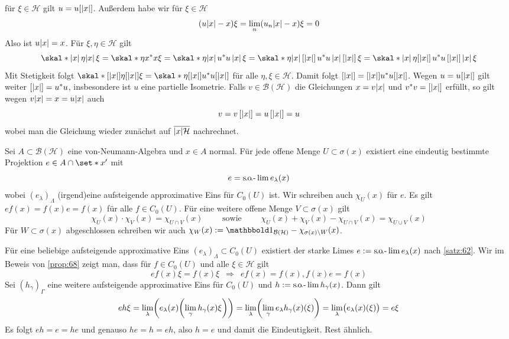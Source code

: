 \begin{beweis}
\[	\]
	für $\xi \in \mathcal{H}$ gilt $u= u [\abs*{x}]$.
	Außerdem habe wir für $\xi \in \mathcal{H}$
	\begin{align}
		\enbrace*{u \abs*{x}- x} \xi = \lim_n (u_n \abs*{x} - x) \xi = 0 
	\end{align}
	Also ist $u \abs*{x}=x$.
	Für $\xi,\eta \in \mathcal{H}$ gilt 
	\[
		\skal*{\abs*{x}\, \eta}{\abs*{x}\, \xi} = \skal*{\eta}{x^*x \xi} = \skal*{\eta}{\abs*{x}\, u^*u \,\abs*{x}\, \xi} = \skal*{\eta}{ \abs*{x}\, [\abs*{x}]\, u^*u \,\abs*{x}\, [\abs*{x}]\, \xi} 
		= \skal*{\abs*{x}\,\eta}{[\abs*{x}]\, u^*u \,[\abs*{x}]\, \abs*{x}\, \xi}
	\]
	Mit Stetigkeit folgt $\skal*{[\abs*{x}] \eta}{[\abs*{x}] \xi} = \skal*{\eta}{[\abs*{x}] u^*u [\abs*{x}]}$ für alle $\eta,\xi \in \mathcal{H}$.
	Damit folgt $[\abs*{x}] = [\abs*{x}] u^*u [\abs*{x}]$.
	Wegen $u=u[\abs*{x}]$ gilt weiter $[\abs*{x}]=u^*u$, insbesondere ist $u$ eine partielle Isometrie.
	Falls $v \in \mathcal{B}(\mathcal{H})$ die Gleichungen $x=v \abs*{x}$ und $v^*v= [\abs*{x}]$ erfüllt, so gilt wegen $v \abs*{x}=x=u \abs*{x}$ auch 
	\[
		v= v\, [\abs*{x}] = u \,[\abs*{x}] = u 
	\]
	wobei man die Gleichung wieder zunächst auf $\overline{\abs*{x} \mathcal{H}}$ nachrechnet.
\end{beweis}

\begin{proposition}[label=prop:612]
	Sei $A \subset \mathcal{B}(\mathcal{H})$ eine von-Neumann-Algebra und $x \in A$ normal.
	Für jede offene Menge $U \subset \sigma(x)$ existiert eine eindeutig bestimmte Projektion $e \in A \cap \set*{x}'$ mit 
	\[
		e=\solim e_\lambda(x)
	\]
	wobei $(e_\lambda)_\Lambda$ (irgend)eine aufsteigende approximative Eins für $C_0(U)$ ist.
	Wir schreiben auch $\chi_U(x)$ für $e$.
	Es gilt $e f(x) = f(x) e = f(x)$ für alle $f \in C_0(U)$.
	Für eine weitere offene Menge $V \subset \sigma(x)$ gilt 
	\[
		\chi_U(x) \cdot \chi_V(x) = \chi_{U \cap V}(x) \qquad \text{ sowie } \qquad  \chi_U(x) + \chi_V(x) - \chi_{U \cap V}(x)= \chi_{U \cup V}(x) 
	\]
	Für $W \subset \sigma(x)$ abgeschlossen schreiben wir auch $\chi_W(x) := \ind_{\mathcal{B}(\mathcal{H})}-\chi_{\sigma(x)\setminus W}(x)$.
\end{proposition}
\begin{beweis}
	Für eine beliebige aufsteigende approximative Eins $(e_\lambda)_\Lambda \subset C_0(U)$ existiert der starke Limes $e := \solim e_\lambda(x)$ nach \autoref{satz:62}.
	Wir im Beweis von \autoref{prop:68} zeigt man, dass für $f \in C_0(U)$ und alle $\xi \in \mathcal{H}$ gilt
	\[
		e f(x) \xi = f(x) \xi \enspace\Longrightarrow\enspace e f(x) = f(x), f(x) e = f(x)
	\]
	Sei $(h_\gamma)_{\Gamma}$ eine weitere aufsteigende approximative Eins für $C_0(U)$ und $h := \solim h_\gamma(x)$.
	Dann gilt
	\[
		e h \xi = \lim_\lambda \enbrace*{e_\lambda(x) \enbrace*{\lim_\gamma h_\gamma(x) \xi}} = \lim_{\lambda} \enbrace*{\lim_\gamma e_\lambda h_\gamma(x)(\xi)}
		= \lim_\lambda \enbrace[\big]{e_\lambda(x)(\xi)} = e \xi
	\]
	Es folgt $ e h = e = h e$ und genauso $h e = h =eh$, also $h=e$ und damit die Eindeutigkeit. Rest ähnlich.
\end{beweis}

